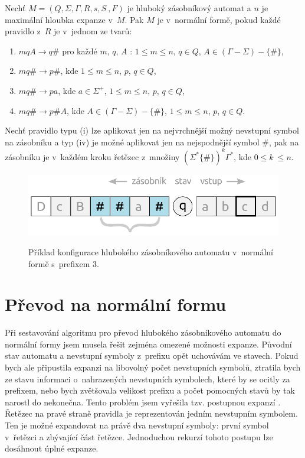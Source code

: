 \begin{Def}\label{def_NF}
Nechť $M = (Q,\Sigma,\Gamma, R, s, S~, F)$ je hluboký zásobníkový automat
a $n$ je maximální hloubka expanze v~$M$.
Pak $M$ je v~normální formě, pokud každé pravidlo z~$R$ je v~jednom ze tvarů:

\begin{enumerate}
\renewcommand{\labelenumi}{(\roman{enumi})}

\item $mqA \rightarrow q\#$ pro každé $m$, $q$, $A$ : $1 \le m \le n$, $q \in Q$, $A \in (\Gamma - \Sigma) - \{\#\}$,
\item $mq\# \rightarrow p\#$, kde $1 \le m \le n$, $p$, $q \in Q$,
\item $mq\# \rightarrow pa$, kde $a \in {\Sigma}^+$, $1 \le m \le n$, $p$, $q \in Q$,
\item $mq\# \rightarrow p\#A$, kde $A \in (\Gamma - \Sigma) - \{\#\}$, $1 \le m \le n$, $p$, $q \in Q$.

\end{enumerate}

Nechť pravidlo typu (i) lze aplikovat jen na nejvrchnější možný nevstupní symbol na zásobníku a typ (iv) je možné aplikovat jen na nejspodnější symbol $\#$, pak na zásobníku je v~každém kroku řetězec z~množiny $ ( \Sigma^* \{ \# \} )^k  \Gamma^*$, kde $0 \le k~\le n$. 

\end{Def}


\begin{figure}[ht]
\centering
\includegraphics{img/bp_pda04.eps} \bigskip \\
\caption{Příklad konfigurace hlubokého zásobníkového automatu v~normální formě s~prefixem 3.}
\end{figure}

\section{Převod na normální formu}

Při sestavování algoritmu pro převod hlubokého zásobníkového automatu do normální formy jsem musela řešit zejména omezené možnosti expanze. Původní stav automatu a nevstupní symboly z~prefixu opět uchovávám ve stavech. Pokud bych ale připustila expanzi na libovolný počet nevstupních symbolů, ztratila bych ze stavu informaci o~nahrazených nevstupních symbolech, které by se ocitly za prefixem, nebo bych zvětšovala velikost prefixu a počet pomocných stavů by tak narostl do nekonečna. Tento problém jsem vyřešila tzv. postupnou expanzí \cite{Meduna:Theory}. Řetězec na pravé straně pravidla je reprezentován jedním nevstupním symbolem. Ten je možné expandovat na právě dva nevstupní symboly: první symbol v~řetězci a zbývající část řetězce. Jednoduchou rekurzí tohoto postupu lze dosáhnout úplné expanze.

